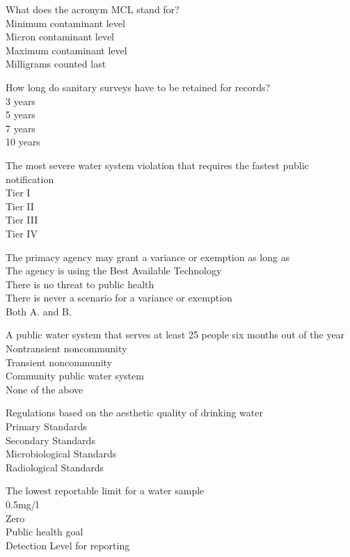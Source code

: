  What does the acronym MCL stand for?\\

Minimum contaminant level\\
Micron contaminant level\\
Maximum contaminant level\\
Milligrams counted last


 How long do sanitary surveys have to be retained for records?\\

3 years\\
5 years\\
7 years\\
10 years


The most severe water system violation that requires the fastest public notification\\

Tier I\\
Tier II\\
Tier III\\
Tier IV


 The primacy agency may grant a variance or exemption as long as\\

The agency is using the Best Available Technology\\
There is no threat to public health\\
There is never a scenario for a variance or exemption\\
Both A. and B.


 A public water system that serves at least 25 people six months out of the year\\

Nontransient noncommunity\\
Transient noncommunity\\
Community public water system\\
None of the above


 Regulations based on the aesthetic quality of drinking water\\

Primary Standards\\
Secondary Standards\\
Microbiological Standards\\
Radiological Standards


 The lowest reportable limit for a water sample\\

0.5mg/l\\
Zero\\
Public health goal\\
Detection Level for reporting


